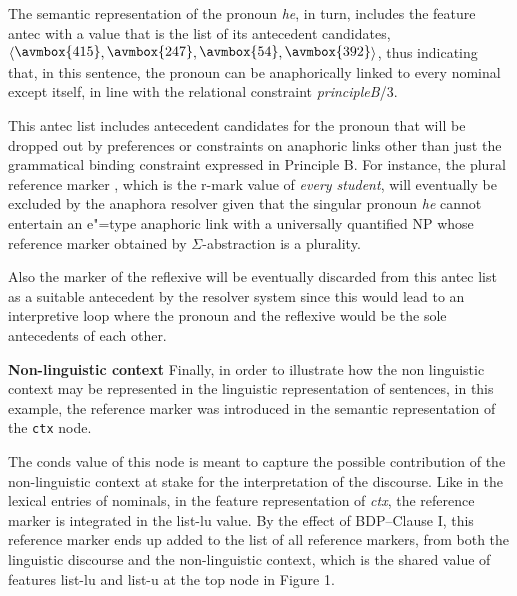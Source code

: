 \documentclass[output=paper
,modfonts
,nonflat]{langsci/langscibook}
\begin{document}
The semantic representation of the pronoun \emph{he}, in turn,
includes the feature \mbox{{\sc antec}} with a value that is the list
of its antecedent candidates, 
$\langle\raisebox{.25ex}{\avmbox{415}},\raisebox{.25ex}{\avmbox{247}},\raisebox{.25ex}{\avmbox{54}},\raisebox{.25ex}{\avmbox{392}}\rangle$,
thus indicating that, in this sentence,
the pronoun can be anaphorically linked to every nominal except itself, 
in line with the relational constraint \emph{principleB}/3. 

This {\sc antec} list includes antecedent
candidates for the pronoun that will be dropped out by preferences
or constraints on
anaphoric links other than just the grammatical binding constraint expressed in Principle B. 
For instance,
the plural reference marker 
,
which is the {\sc r-mark} value of \emph{every student},
will eventually be excluded by the anaphora resolver
given that the singular pronoun \emph{he} cannot
entertain an e"=type anaphoric link with a universally quantified NP
whose reference marker obtained by 
\mbox{$\Sigma$-abstraction} is a plurality.

Also the marker 
of the reflexive
will be eventually discarded from this {\sc antec} list as a suitable antecedent by the resolver system
since this would lead to an interpretive loop where the pronoun and the
reflexive would be the sole antecedents of each other.

\textbf{Non-linguistic context} Finally, in order to illustrate how the non linguistic context may be represented 
in the linguistic representation of sentences, 
in this example, the reference marker  
was introduced in the semantic representation of the \texttt{ctx} node. 

The {\sc conds} value of this node is meant to capture the possible contribution 
of the non-linguistic context at stake for the interpretation of the discourse. 
Like in the lexical entries of nominals, in the feature representation of \emph{ctx},
the reference marker 
is integrated in the {\sc list-lu} value.
By the effect of BDP--Clause I, this reference marker ends up added to the list of 
all reference markers, from both the linguistic discourse and the non-linguistic
context, which is the shared value of features {\sc list-lu} and {\sc list-u} at the top node in Figure 1.
\end{document}
